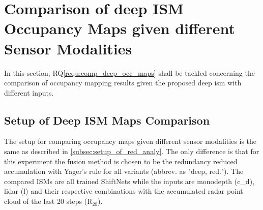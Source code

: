 \section{Comparison of deep ISM Occupancy Maps given different Sensor Modalities}
\label{sec:exp_comparison_deep_ism_maps_diff_sensors}
In this section, RQ\ref{requ:comp_deep_occ_maps} shall be tackled concerning the comparison of occupancy mapping results given the proposed deep \gls{ism} with different inputs.
%
\subsection{Setup of Deep ISM Maps Comparison}
\label{subsec:setup_analyze_deep_ism_maps_diff_sensors}
The setup for comparing occupancy maps given different sensor modalities is the same as described in \ref{subsec:setup_of_red_analy}. The only difference is that for this experiment the fusion method is chosen to be the redundancy reduced accumulation with Yager's rule for all variants (abbrev. as "deep, red."). The compared ISMs are all trained ShiftNets while the inputs are \gls{monodepth} (\gls{c_d}), lidar (\gls{l}) and their respective combinations with the accumulated radar point cloud of the last 20 steps (R$_{20}$). 
%
